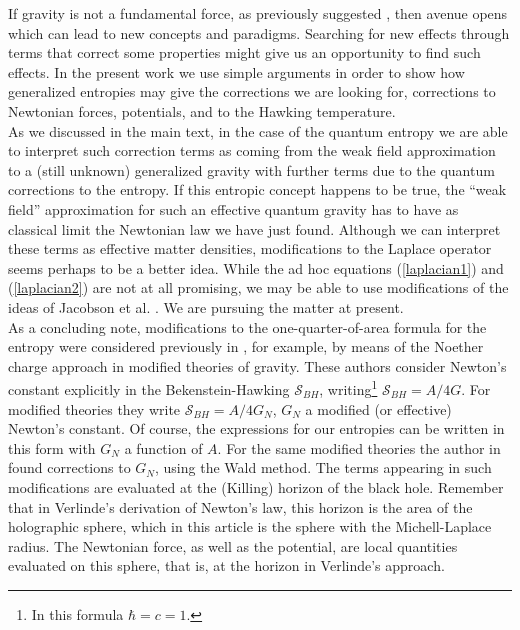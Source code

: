 \documentclass[nofootinbib,aps,prd,preprint,groupedaddress,showpacs,showkeys]{revtex4-1}
\begin{document}
\noindent If gravity is not a fundamental force, as previously suggested \cite{Jacobson1, Jacobson2, Verlinde}, then avenue opens which can lead to new concepts and paradigms. Searching for new effects through terms that correct some properties might give us an opportunity to find such effects. In the present work we use simple arguments in order to show how generalized entropies may give the corrections we are looking for, corrections to Newtonian forces,  potentials, and to the Hawking temperature.\\
\indent As we discussed in the main text, in the case of the quantum entropy we are able to interpret such correction terms as coming from the weak field approximation to a (still unknown) generalized gravity with further terms due to the quantum corrections to the entropy. If this entropic concept happens to be true, the ``weak field'' approximation for such an effective quantum gravity has to have as classical limit the Newtonian law we have just found. Although we can interpret these terms as effective matter densities, modifications to the Laplace operator seems perhaps to be a better idea. While the ad hoc equations (\ref{laplacian1}) and (\ref{laplacian2}) are not at all promising, we may be able to use modifications of the ideas of Jacobson et al. \cite{Jacobson3, Jacobson4}. We are pursuing the matter at present.\\
\indent As a concluding note, modifications to the one-quarter-of-area formula for the entropy were considered previously in \cite{Visser, JKM}, for example, by means of the Noether charge approach \cite{Wald} in modified theories of gravity. These authors consider Newton's constant explicitly in the Bekenstein-Hawking $\mathcal{S}_{BH}$, writing\footnote{In this formula $\hbar = c = 1$.} $\mathcal{S}_{BH} = A/4G$.  For modified theories they write $\mathcal{S}_{BH} = A/4G_N$, $G_N$ a modified (or effective) Newton's constant. Of course, the expressions for our entropies can be written in this form with $G_N$ a function of $A$.  For the same modified theories the author in \cite{Vollik} found corrections to $G_N$, using the Wald method. The terms appearing in such modifications are evaluated at the (Killing) horizon of the black hole. Remember that in Verlinde's derivation of Newton's law, this horizon is the area of the holographic sphere, which in this article is the sphere with the Michell-Laplace radius. The Newtonian force, as well as the potential, are local quantities evaluated on this sphere, that is, at the horizon in Verlinde's approach.
\end{document}
